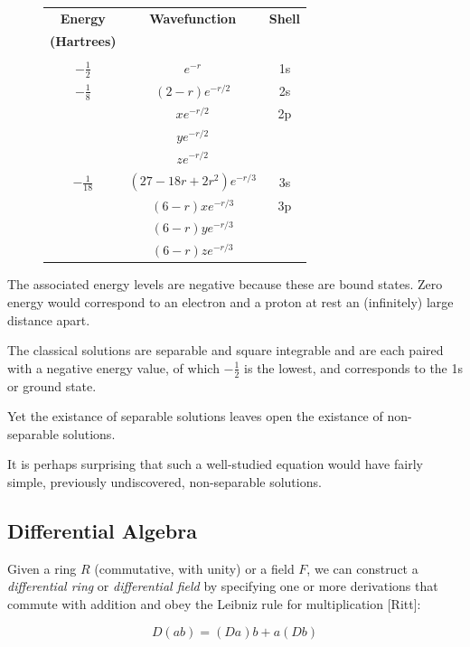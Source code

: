 \documentclass{article}
\begin{document}
\begin{figure}
\begin{center}
\begin{tabular}{ccc}
{\bf Energy}		& {\bf Wavefunction}		& {\bf Shell} \\
{\bf (Hartrees)}	& & \\
\\
$-\frac{1}{2}$		& $e^{-r}$			& 1s \\
$-\frac{1}{8}$		& $(2-r)e^{-r/2}$		& 2s \\
			& $xe^{-r/2}$			& 2p \\
			& $ye^{-r/2}$			\\
			& $ze^{-r/2}$			\\
$-\frac{1}{18}$		& $(27-18r+2r^2)e^{-r/3}$	& 3s \\
			& $(6-r)xe^{-r/3}$		& 3p \\
			& $(6-r)ye^{-r/3}$		\\
			& $(6-r)ze^{-r/3}$		\\
\end{tabular}
\end{center}
\end{figure}

The associated energy levels are negative because these are bound states.  Zero energy
would correspond to an electron and a proton at rest an (infinitely) large distance apart.

The classical solutions are separable and square integrable
and are each paired with a negative energy value, of which $-\frac{1}{2}$ is the lowest,
and corresponds to the 1s or ground state.

Yet the existance of separable solutions leaves open the existance of non-separable solutions.

It is perhaps surprising that such a well-studied equation would have fairly simple, previously
undiscovered, non-separable solutions.

\subsection*{Differential Algebra}

Given a ring $R$ (commutative, with unity) or a field $F$, we can construct a
{\it differential ring} or {\it differential field}
by specifying one or more derivations that commute
with addition and obey the Leibniz rule for multiplication [Ritt]:

\begin{equation*}
D(ab) = (Da)b + a(Db)
\end{equation*}
\end{document}
